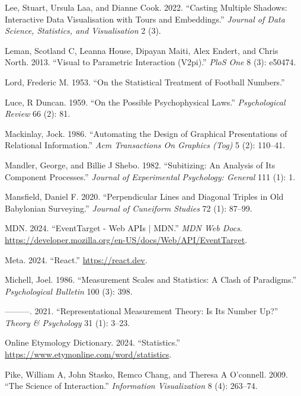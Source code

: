 \documentclass[
]{book}
\newlength{\cslhangindent}
\newenvironment{CSLReferences}[2] %
 {\begin{list}{}{%
  \setlength{\itemindent}{0pt}
  \setlength{\leftmargin}{0pt}
  \setlength{\parsep}{0pt}
  \ifodd #1
   \setlength{\leftmargin}{\cslhangindent}
   \setlength{\itemindent}{-1\cslhangindent}
  \fi
  \setlength{\itemsep}{#2\baselineskip}}}
 {\end{list}}
\begin{document}
\begin{CSLReferences}{1}{0}
Lee, Stuart, Ursula Laa, and Dianne Cook. 2022. {``Casting Multiple Shadows: Interactive Data Visualisation with Tours and Embeddings.''} \emph{Journal of Data Science, Statistics, and Visualisation} 2 (3).

Leman, Scotland C, Leanna House, Dipayan Maiti, Alex Endert, and Chris North. 2013. {``Visual to Parametric Interaction (V2pi).''} \emph{PloS One} 8 (3): e50474.

Lord, Frederic M. 1953. {``On the Statistical Treatment of Football Numbers.''}

Luce, R Duncan. 1959. {``On the Possible Psychophysical Laws.''} \emph{Psychological Review} 66 (2): 81.

Mackinlay, Jock. 1986. {``Automating the Design of Graphical Presentations of Relational Information.''} \emph{Acm Transactions On Graphics (Tog)} 5 (2): 110--41.

Mandler, George, and Billie J Shebo. 1982. {``Subitizing: An Analysis of Its Component Processes.''} \emph{Journal of Experimental Psychology: General} 111 (1): 1.

Mansfield, Daniel F. 2020. {``Perpendicular Lines and Diagonal Triples in Old Babylonian Surveying.''} \emph{Journal of Cuneiform Studies} 72 (1): 87--99.

MDN. 2024. {``EventTarget - Web APIs {\(\vert\)} MDN.''} \emph{MDN Web Docs}. \url{https://developer.mozilla.org/en-US/docs/Web/API/EventTarget}.

Meta. 2024. {``React.''} \url{https://react.dev}.

Michell, Joel. 1986. {``Measurement Scales and Statistics: A Clash of Paradigms.''} \emph{Psychological Bulletin} 100 (3): 398.

---------. 2021. {``Representational Measurement Theory: Is Its Number Up?''} \emph{Theory \& Psychology} 31 (1): 3--23.

Online Etymology Dictionary. 2024. {``Statistics.''} \url{https://www.etymonline.com/word/statistics}.

Pike, William A, John Stasko, Remco Chang, and Theresa A O'connell. 2009. {``The Science of Interaction.''} \emph{Information Visualization} 8 (4): 263--74.


\end{CSLReferences}
\end{document}
